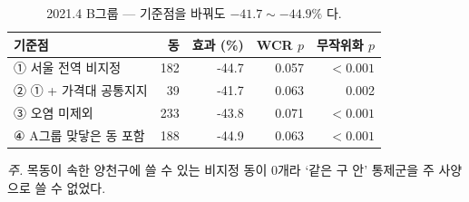 \begin{table}[htbp]
  \centering
  \caption{2021.4 B그룹 --- 기준점을 바꿔도 $-41.7 \sim -44.9\%$ 다.}
  \label{tab:ladder-b}
  \begin{tabular}{lrrrr}
    \toprule
    \textbf{기준점} & \textbf{동} & \textbf{효과 (\%)} & \textbf{WCR $p$} & \textbf{무작위화 $p$} \\
    \midrule
    ① 서울 전역 비지정 & 182 & -44.7 & 0.057 & $<0.001$ \\
    ② ① + 가격대 공통지지 & 39 & -41.7 & 0.063 & 0.002 \\
    ③ 오염 미제외 & 233 & -43.8 & 0.071 & $<0.001$ \\
    ④ A그룹 맞닿은 동 포함 & 188 & -44.9 & 0.063 & $<0.001$ \\
    \bottomrule
  \end{tabular}

  \begin{minipage}{\linewidth}\footnotesize
  \textit{주.} 목동이 속한 양천구에 쓸 수 있는 비지정 동이 0개라 `같은 구 안' 통제군을 주 사양으로 쓸 수 없었다.
  \end{minipage}
\end{table}
